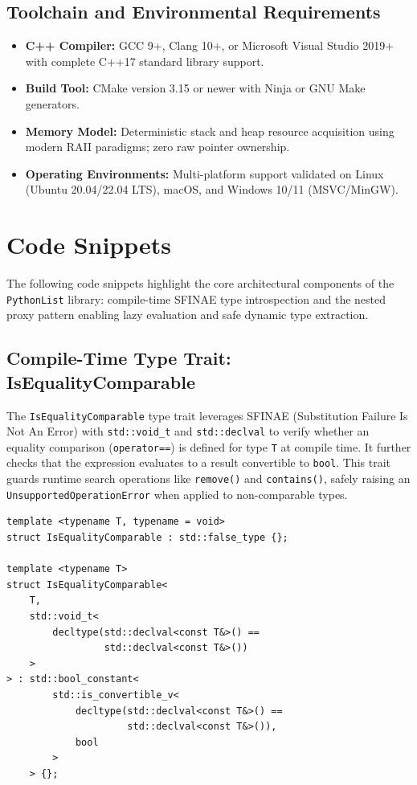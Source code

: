 \documentclass[12pt,a4paper]{report}
\begin{document}
\subsection{Toolchain and Environmental Requirements}
\begin{itemize}
    \item \textbf{C++ Compiler:} GCC 9+, Clang 10+, or Microsoft Visual Studio 2019+ with complete C++17 standard library support.
    \item \textbf{Build Tool:} CMake version 3.15 or newer with Ninja or GNU Make generators.
    \item \textbf{Memory Model:} Deterministic stack and heap resource acquisition using modern RAII paradigms; zero raw pointer ownership.
    \item \textbf{Operating Environments:} Multi-platform support validated on Linux (Ubuntu 20.04/22.04 LTS), macOS, and Windows 10/11 (MSVC/MinGW).
\end{itemize}

\newpage
\section{Code Snippets}

The following code snippets highlight the core architectural components of the \texttt{PythonList} library: compile-time SFINAE type introspection and the nested proxy pattern enabling lazy evaluation and safe dynamic type extraction.

\subsection{Compile-Time Type Trait: IsEqualityComparable}
The \texttt{IsEqualityComparable} type trait leverages SFINAE (Substitution Failure Is Not An Error) with \texttt{std::void\_t} and \texttt{std::declval} to verify whether an equality comparison (\texttt{operator==}) is defined for type \texttt{T} at compile time. It further checks that the expression evaluates to a result convertible to \texttt{bool}. This trait guards runtime search operations like \texttt{remove()} and \texttt{contains()}, safely raising an \texttt{UnsupportedOperationError} when applied to non-comparable types.

\begin{lstlisting}[style=cppsnippet]
template <typename T, typename = void>
struct IsEqualityComparable : std::false_type {};

template <typename T>
struct IsEqualityComparable<
    T,
    std::void_t<
        decltype(std::declval<const T&>() ==
                 std::declval<const T&>())
    >
> : std::bool_constant<
        std::is_convertible_v<
            decltype(std::declval<const T&>() ==
                     std::declval<const T&>()),
            bool
        >
    > {};
\end{lstlisting}
\end{document}

